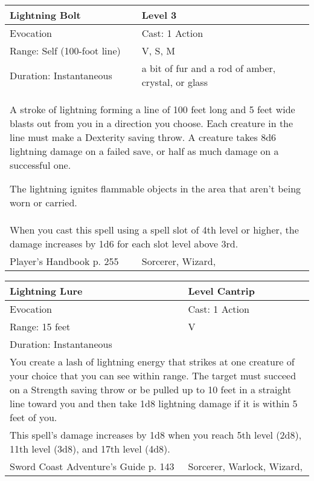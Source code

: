 \documentclass[11pt]{report}
\begin{document}
\begin{table}[H]
	\begin{tabular}{||p{6cm}|p{6cm}||}
		\hline\hline
		\bf{Lightning Bolt} & Level 3\\ \hline
		Evocation & Cast: 1 Action\\ \hline
		Range: Self (100-foot line) & V, S, M\\ \hline
		Duration: Instantaneous & a bit of fur and a rod of amber, crystal, or glass\\ \hline
		\multicolumn{2}{||p{12cm}||}{A stroke of lightning forming a line of 100 feet long and 5 feet wide blasts out from you in a direction you choose. Each creature in the line must make a Dexterity saving throw. A creature takes 8d6 lightning damage on a failed save, or half as much damage on a successful one.

The lightning ignites flammable objects in the area that aren’t being worn or carried.}\\ \hline
		\multicolumn{2}{||p{12cm}||}{When you cast this spell using a spell slot of 4th level or higher, the damage increases by 1d6 for each slot level above 3rd.}\\ \hline
Player's Handbook p. 255 & Sorcerer, Wizard, \\ \hline\hline
	\end{tabular}
\end{table}

\begin{table}[H]
	\begin{tabular}{||p{6cm}|p{6cm}||}
		\hline\hline
		\bf{Lightning Lure} & Level Cantrip\\ \hline
		Evocation & Cast: 1 Action\\ \hline
		Range: 15 feet & V\\ \hline
		Duration: Instantaneous & \\ \hline
		\multicolumn{2}{||p{12cm}||}{You create a lash of lightning energy that strikes at one creature of your choice that you can see within range.
The target must succeed on a Strength saving throw or be pulled up to 10 feet in a straight line toward you and then take 1d8 lightning damage if it is within 5 feet of you.}\\ \hline
		\multicolumn{2}{||p{12cm}||}{This spell's damage increases by 1d8 when you reach 5th level (2d8), 11th level (3d8), and 17th level (4d8).}\\ \hline
Sword Coast Adventure's Guide p. 143 & Sorcerer, Warlock, Wizard, \\ \hline\hline
	\end{tabular}
\end{table}
\end{document}
